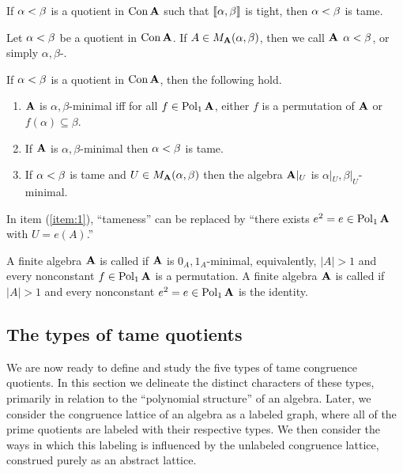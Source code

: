 \begin{theorem}
If $\alpha < \beta$ is a quotient in $\operatorname{Con} \mathbf{A}$ such that $\llbracket \alpha, \beta \rrbracket$ is tight,
then $\alpha < \beta$ is tame.
\end{theorem}

\newcommand{\abmin}{$\alpha, \beta$-minimal\xspace}

Let $\alpha < \beta$ be a quotient in $\operatorname{Con}\mathbf{A}$.
If $A \in M_{\mathbf{A}} (\alpha, \beta)$, then we call $\mathbf{A}$  
$\alpha < \beta$, or simply $\alpha, \beta$-.
\begin{lemma}
If $\alpha < \beta$ is a quotient in $\operatorname{Con}\mathbf{A}$, then the following hold.
\begin{enumerate}[(1)]
\item $\mathbf{A}$ is \abmin iff for all $f\in \operatorname{Pol}_1\mathbf{A}$, 
  either $f$ is a permutation of $\mathbf{A}$ or $f(\alpha) \subseteq \beta$.
\item If $\mathbf{A}$ is \abmin then $\alpha < \beta$ is tame.
\item \label{item:1}
  If $\alpha < \beta$ is tame and $U \in M_{\mathbf{A}} (\alpha, \beta)$ then the algebra 
  $\mathbf{A}|_U$ is $\alpha|_U, \beta|_U$-minimal.
\end{enumerate}
In item (\ref{item:1}), ``tameness'' can be replaced by ``there exists 
$e^2 = e\in \operatorname{Pol}_1\mathbf{A}$ with $U = e(A)$.''
\end{lemma}

A finite algebra $\mathbf{A}$ is called  if 
$\mathbf{A}$ is $0_A, 1_A$-minimal, equivalently, $|A|>1$ and every nonconstant 
$f\in \operatorname{Pol}_1\mathbf{A}$ is a permutation. 
A finite algebra $\mathbf{A}$ is called  if 
$|A|> 1$ and every nonconstant $e^2 = e\in \operatorname{Pol}_1\mathbf{A}$ is
the identity.

\subsection{The types of tame quotients}
We are now ready to define and study the five types of tame congruence quotients.
In this section we delineate the distinct characters of these types, primarily in
relation to the ``polynomial structure'' of an algebra. Later, we
consider the congruence lattice of an algebra as a labeled graph, where all of
the prime quotients are labeled with their respective types. We then consider
the ways in which this labeling is influenced by the unlabeled congruence lattice,
construed purely as an abstract lattice.

